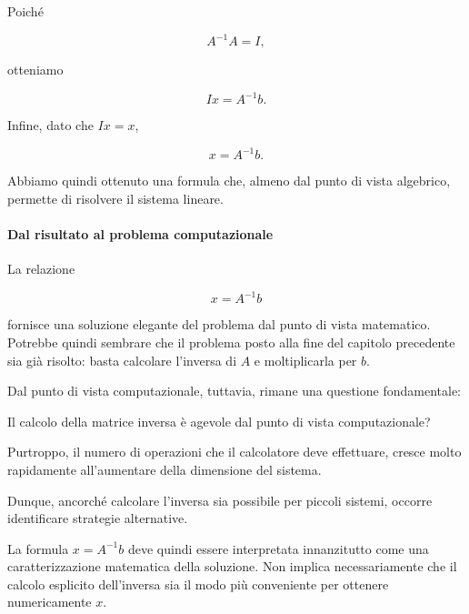 Poiché

\begin{equation*}
A^{-1}A=I,
\end{equation*}

otteniamo

\begin{equation*}
Ix=A^{-1}b.
\end{equation*}

Infine, dato che $Ix=x$,

\begin{equation*}
x=A^{-1}b.
\label{eq:soluzione_inversa}
\end{equation*}

Abbiamo quindi ottenuto una formula che, almeno dal punto di vista
algebrico, permette di risolvere il sistema lineare.


\paragraph{Dal risultato al problema computazionale}

La relazione

\begin{equation*}
x=A^{-1}b
\end{equation*}

fornisce una soluzione elegante del problema dal punto di vista
matematico. Potrebbe quindi sembrare che il problema posto alla
fine del capitolo precedente sia già risolto: basta calcolare
l'inversa di $A$ e moltiplicarla per $b$.

Dal punto di vista computazionale, tuttavia, rimane una questione
fondamentale:

Il calcolo della matrice inversa è agevole dal punto di vista computazionale?

Purtroppo, il numero di operazioni che il calcolatore deve effettuare, cresce molto rapidamente all'aumentare della dimensione del sistema.

Dunque, ancorché calcolare l'inversa sia possibile per piccoli sistemi, occorre identificare strategie alternative. 


La formula $x=A^{-1}b$ deve quindi essere interpretata innanzitutto
come una caratterizzazione matematica della soluzione. Non implica
necessariamente che il calcolo esplicito dell'inversa sia il modo
più conveniente per ottenere numericamente $x$.

